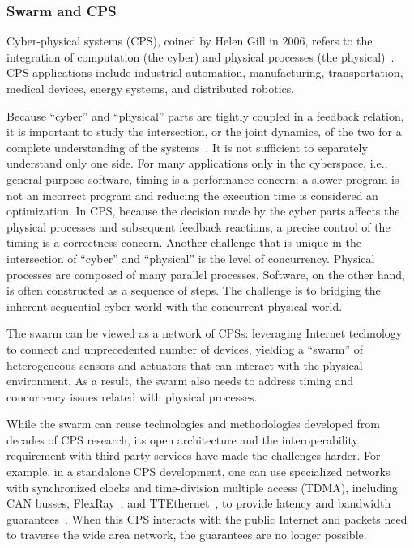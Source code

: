 \subsubsection{Swarm and CPS}
\label{sec:swarm-cps}

Cyber-physical systems (CPS), coined by Helen Gill in 2006, refers to the
integration of computation (the cyber) and physical processes (the
physical)~\cite{lee2015past}. CPS applications include industrial automation,
manufacturing, transportation, medical devices, energy systems, and distributed
robotics.

Because ``cyber'' and ``physical'' parts are tightly coupled in a feedback
relation, it is important to study the intersection, or the joint dynamics, of
the two for a complete understanding of the systems~\cite{rajkumar2010cyber}. It
is not sufficient to separately understand only one side. For many applications
only in the cyberspace, i.e., general-purpose software, timing is a performance
concern: a slower program is not an incorrect program and reducing the execution
time is considered an optimization. In CPS, because the decision made by the
cyber parts affects the physical processes and subsequent feedback reactions, a
precise control of the timing is a correctness concern. Another challenge that
is unique in the intersection of ``cyber'' and ``physical'' is the level of
concurrency. Physical processes are composed of many parallel
processes. Software, on the other hand, is often constructed as a sequence of
steps. The challenge is to bridging the inherent sequential cyber world with the
concurrent physical world.

The swarm can be viewed as a network of CPSs: leveraging Internet technology to
connect and unprecedented number of devices, yielding a ``swarm'' of
heterogeneous sensors and actuators that can interact with the physical
environment. As a result, the swarm also needs to address timing and concurrency
issues related with physical processes.

While the swarm can reuse technologies and methodologies developed from decades
of CPS research, its open architecture and the interoperability requirement with
third-party services have made the challenges harder. For example, in a
standalone CPS development, one can use specialized networks with synchronized
clocks and time-division multiple access (TDMA), including CAN busses,
FlexRay~\cite{flexray2005flexray}, and TTEthernet~\cite{steiner2008ttethernet},
to provide latency and bandwidth guarantees~\cite{lee2018real}. When this CPS
interacts with the public Internet and packets need to traverse the wide area
network, the guarantees are no longer possible.

